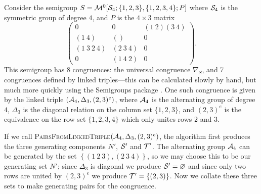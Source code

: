 \begin{example}
  \label{ex:linked-triple-to-pairs-3x4}
  Consider the semigroup
  $S = \mathcal{M}^0[\mathcal{S}_4; \{1, 2, 3\}, \{1, 2, 3, 4\};P]$ where
  $\mathcal{S}_4$ is the symmetric group of degree $4$, and $P$ is the $4 \times 3$
  matrix
  $$
  \begin{pmatrix}
    0 & 0 & (1~2)(3~4) \\
    (1~4) & () & 0 \\
    (1~3~2~4) & (2~3~4) & 0 \\
    0 & (1~4~2) & 0
  \end{pmatrix}.
  $$
  This semigroup has 8 congruences: the universal congruence $\nabla_S$, and 7
  congruences defined by linked triples---this can be calculated slowly by hand,
  but much more quickly using the Semigroups package \cite{semigroups}.  One
  such congruence is given by the linked triple $\left(\mathcal{A}_4, \Delta_3, (2,3)^e\right)$,
  where $\mathcal{A}_4$ is the alternating group of degree $4$, $\Delta_3$ is the
  diagonal relation on the column set $\{1, 2, 3\}$, and $(2,3)^e$ is the
  equivalence on the row set $\{1, 2, 3, 4\}$ which only unites rows $2$ and
  $3$.

  If we call
  \textsc{PairsFromLinkedTriple}$\left(\mathcal{A}_4, \Delta_3,
    (2,3)^e\right)$,
  the algorithm first produces the three generating components $N'$, $\mathcal{S}'$ and
  $\mathcal{T}'$.  The alternating group $\mathcal{A}_4$ can be generated by the set
  $\left\{(1~2~3), (2~3~4)\right\}$, so we may choose this to be our generating
  set $N'$; since $\Delta_3$ is diagonal we produce $\mathcal{S}' = \varnothing$ and
  since only two rows are united by $(2,3)^e$ we produce
  $\mathcal{T}' = \left\{(2,3)\right\}$.  Now we collate these three sets to make
  generating pairs for the congruence.


\end{example}
